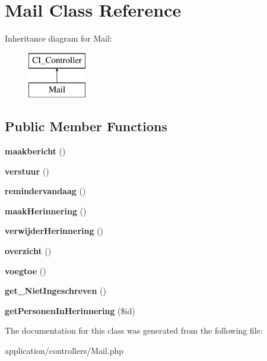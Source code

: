\hypertarget{class_mail}{}\section{Mail Class Reference}
\label{class_mail}
Inheritance diagram for Mail\+:\begin{figure}[H]
\begin{center}
\leavevmode
\includegraphics[height=2.000000cm]{class_mail}
\end{center}
\end{figure}
\subsection*{Public Member Functions}
\begin{DoxyCompactItemize}
\item 
\mbox{\label{class_mail_a81e2a70ab567831ba097167138f7a01f}} 
{\bfseries maakbericht} ()
\item 
\mbox{\label{class_mail_abc7aefe96831182f37ef67ef34e62527}} 
{\bfseries verstuur} ()
\item 
\mbox{\label{class_mail_ad32500041b0b1aca5cb9857134aef2fa}} 
{\bfseries remindervandaag} ()
\item 
\mbox{\label{class_mail_a6c70daaf35d6c8f7ff2531c57b5e8cbb}} 
{\bfseries maak\+Herinnering} ()
\item 
\mbox{\label{class_mail_af953414894f70a47dcf5986212c7e68d}} 
{\bfseries verwijder\+Herinnering} ()
\item 
\mbox{\label{class_mail_aedd51c36c569faeb3c151027eb79e67d}} 
{\bfseries overzicht} ()
\item 
\mbox{\label{class_mail_aba42b30d30a5aca661ea48add5edb520}} 
{\bfseries voegtoe} ()
\item 
\mbox{\label{class_mail_a7b5977af30820df385dc88ee0fd2a6bd}} 
{\bfseries get\+\_\+\+Niet\+Ingeschreven} ()
\item 
\mbox{\label{class_mail_a08ee322d4585335986150c5b3504b1a6}} 
{\bfseries get\+Personen\+In\+Herinnering} (\$id)
\end{DoxyCompactItemize}


The documentation for this class was generated from the following file\+:\begin{DoxyCompactItemize}
\item 
application/controllers/Mail.\+php\end{DoxyCompactItemize}
